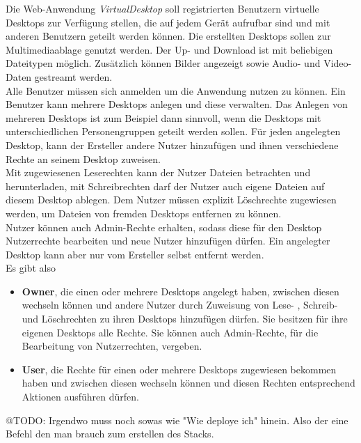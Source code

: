 \documentclass[a4paper, 12pt]{scrreprt}
\begin{document}
Die Web-Anwendung \textit{VirtualDesktop} soll registrierten Benutzern virtuelle Desktops zur Verfügung stellen, die auf jedem Gerät aufrufbar sind und mit anderen Benutzern geteilt werden können. Die erstellten Desktops sollen zur Multimediaablage genutzt werden. Der Up- und Download ist mit beliebigen Dateitypen möglich. Zusätzlich können Bilder angezeigt sowie Audio- und Video-Daten gestreamt werden.\\[0.25cm]
Alle Benutzer müssen sich anmelden um die Anwendung nutzen zu können. Ein Benutzer kann mehrere Desktops anlegen und diese verwalten. Das Anlegen von mehreren Desktops ist zum Beispiel dann sinnvoll, wenn die Desktops mit unterschiedlichen Personengruppen geteilt werden sollen.
Für jeden angelegten Desktop, kann der Ersteller andere Nutzer hinzufügen und ihnen verschiedene Rechte an seinem Desktop zuweisen.\\
Mit zugewiesenen Leserechten kann der Nutzer Dateien betrachten und herunterladen, mit Schreibrechten darf der Nutzer auch eigene Dateien auf diesem Desktop ablegen. Dem Nutzer müssen explizit Löschrechte zugewiesen werden, um Dateien von fremden Desktops entfernen zu können.\\
Nutzer können auch Admin-Rechte erhalten, sodass diese für den Desktop Nutzerrechte bearbeiten und neue Nutzer hinzufügen dürfen. Ein angelegter Desktop kann aber nur vom Ersteller selbst entfernt werden.\\ 
Es gibt also
\begin{itemize} 
\item[] \textbf{Owner}, die einen oder mehrere Desktops angelegt haben, zwischen diesen wechseln können und andere Nutzer durch Zuweisung von Lese- , Schreib- und Löschrechten zu ihren Desktops hinzufügen dürfen. Sie besitzen für ihre eigenen Desktops alle Rechte. Sie können auch Admin-Rechte, für die Bearbeitung von Nutzerrechten, vergeben.
\item[] \textbf{User}, die Rechte für einen oder mehrere Desktops zugewiesen bekommen haben und zwischen diesen wechseln können und diesen Rechten entsprechend Aktionen ausführen dürfen.
\end{itemize} 

@TODO: Irgendwo muss noch sowas wie "Wie deploye ich" hinein. Also der eine Befehl den man brauch zum erstellen des Stacks.
\end{document}
